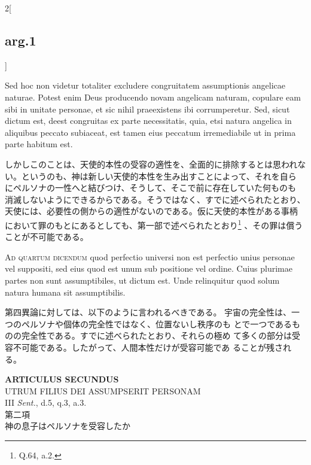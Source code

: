 \documentclass[paper=a4paper,fontsize=10pt,jafontsize=9pt,titlepage]{jlreq}
\begin{document}
\begin{paracol}{2}[\subsection{arg.1}]
\switchcolumn*

Sed hoc non videtur totaliter excludere congruitatem
assumptionis angelicae naturae. Potest enim Deus producendo novam
angelicam naturam, copulare eam sibi in unitate personae, et sic nihil
praeexistens ibi corrumperetur. Sed, sicut dictum est, deest congruitas
ex parte necessitatis, quia, etsi natura angelica in aliquibus peccato
subiaceat, est tamen eius peccatum irremediabile ut in prima parte
habitum est.

\switchcolumn

しかしこのことは、天使的本性の受容の適性を、全面的に排除するとは思われな
 い。というのも、神は新しい天使的本性を生み出すことによって、それを自ら
 にペルソナの一性へと結びつけ、そうして、そこで前に存在していた何ものも
 消滅しないようにできるからである。そうではなく、すでに述べられたとおり、
 天使には、必要性の側からの適性がないのである。仮に天使的本性がある事柄
 において罪のもとにあるとしても、第一部で述べられたとおり\footnote{Q.64,
 a.2.} 、その罪は償う
 ことが不可能である。

\switchcolumn*[\subsection{ad.4}]

{\scshape Ad quartum dicendum} quod perfectio universi non est perfectio unius
personae vel suppositi, sed eius quod est unum sub positione vel
ordine. Cuius plurimae partes non sunt assumptibiles, ut dictum
est. Unde relinquitur quod solum natura humana sit assumptibilis.

\switchcolumn

第四異論に対しては、以下のように言われるべきである。
宇宙の完全性は、一つのペルソナや個体の完全性ではなく、位置ないし秩序のも
 とで一つであるものの完全性である。すでに述べられたとおり、それらの極め
 て多くの部分は受容不可能である。したがって、人間本性だけが受容可能であ
 ることが残される。

\end{paracol}
\newpage



{}
\setcounter{section}{2}
\setcounter{subsection}{0}
\begin{center}
 {\Large {\bfseries ARTICULUS SECUNDUS}}\\
 {\large UTRUM FILIUS DEI ASSUMPSERIT PERSONAM}\\
 {\footnotesize III {\itshape Sent.}, d.5, q.3, a.3.}\\
 {\Large 第二項\\神の息子はペルソナを受容したか}
\end{center}
\end{document}
